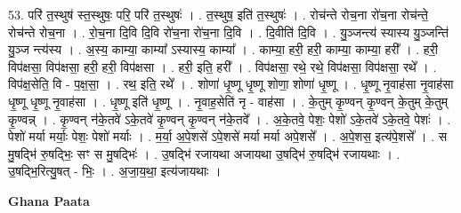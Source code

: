 \documentclass[17pt]{extarticle}
\begin{document}
53. परि॑ त॒स्थुष॑ स्त॒स्थुषः॒ परि॒ परि॑ त॒स्थुषः॑ । . त॒स्थुष॒ इति॑ त॒स्थुषः॑ । . रोच॑न्ते रोच॒ना रो॑च॒ना रोच॑न्ते॒ रोच॑न्ते रोच॒ना । . रो॒च॒ना दि॒वि दि॒वि रो॑च॒ना रो॑च॒ना दि॒वि । . दि॒वीति॑ दि॒वि । . यु॒ञ्जन्त्य॑ स्यास्य यु॒ञ्जन्ति॑ यु॒ञ्ज न्त्य॑स्य । . अ॒स्य॒ काम्या॒ काम्या᳚ ऽस्यास्य॒ काम्या᳚ । . काम्या॒ हरी॒ हरी॒ काम्या॒ काम्या॒ हरी᳚ । . हरी॒ विप॑क्षसा॒ विप॑क्षसा॒ हरी॒ हरी॒ विप॑क्षसा । . हरी॒ इति॒ हरी᳚ । . विप॑क्षसा॒ रथे॒ रथे॒ विप॑क्षसा॒ विप॑क्षसा॒ रथे᳚ । . विप॑क्ष॒सेति॒ वि - प॒क्ष॒सा॒ । . रथ॒ इति॒ रथे᳚ । . शोणा॑ धृ॒ष्णू धृ॒ष्णू शोणा॒ शोणा॑ धृ॒ष्णू । . धृ॒ष्णू नृ॒वाह॑सा नृ॒वाह॑सा धृ॒ष्णू धृ॒ष्णू नृ॒वाह॑सा । . धृ॒ष्णू इति॑ धृ॒ष्णू । . नृ॒वाह॒सेति॑ नृ - वाह॑सा । . के॒तुम् कृ॒ण्वन् कृ॒ण्वन् के॒तुम् के॒तुम् कृ॒ण्वन्न् । . कृ॒ण्वन् न॑के॒तवे॑ ऽके॒तवे॑ कृ॒ण्वन् कृ॒ण्वन् न॑के॒तवे᳚ । . अ॒के॒तवे॒ पेशः॒ पेशो॑ ऽके॒तवे॑ ऽके॒तवे॒ पेशः॑ । . पेशो॑ मर्या मर्याः॒ पेशः॒ पेशो॑ मर्याः । . म॒र्या॒ अ॒पे॒शसे॑ ऽपे॒शसे॑ मर्या मर्या अपे॒शसे᳚ । . अ॒पे॒शस॒ इत्य॑पे॒शसे᳚ । . स मु॒षद्भि॑ रु॒षद्भिः॒ सꣳ स मु॒षद्भिः॑ । . उ॒षद्भि॑ रजायथा अजायथा उ॒षद्भि॑ रु॒षद्भि॑ रजायथाः । . उ॒षद्भि॒रित्यु॒षत् - भिः॒ । . अ॒जा॒य॒था॒ इत्य॑जायथाः । \newline

\textbf{Ghana Paata } \newline
\end{document}
